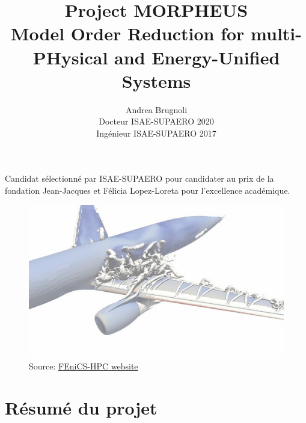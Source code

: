 \documentclass[12pt, french]{article}
\author{Andrea Brugnoli \\ 
	\hspace{2.8pt} Docteur ISAE-SUPAERO 2020\\
	Ingénieur ISAE-SUPAERO 2017}
\title{Project MORPHEUS \\
	\vspace{.3cm}
	\Large{Model Order Reduction for multi-PHysical and Energy-Unified Systems}  }
\date{}
\begin{document}
	
	\maketitle
	
	\large{\noindent Candidat sélectionné par ISAE-SUPAERO pour candidater au prix de la fondation Jean-Jacques et Félicia Lopez-Loreta pour l'excellence académique. }

	
	
	\begin{figure}[h]
		\centering
		\includegraphics[width=.95\textwidth]{3Dplane.jpg}
		\captionsetup{labelformat=empty}
		\caption{Source: \href{http://www.fenics-hpc.org/}{FEniCS-HPC website}}
	\end{figure}
	
	
	
	
	
	\thispagestyle{empty}
	
	\newpage
	
	\tableofcontents
	\newpage
	
	
	\section{Résumé du projet}
	
\end{document}
